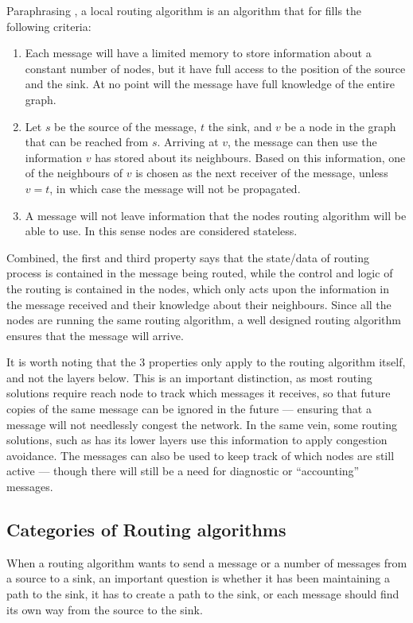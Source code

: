 Paraphrasing \cite{compass}, a local routing algorithm is an algorithm that for fills the following criteria:
\begin{enumerate}
\item Each message will have a limited memory to store information about a constant number of nodes, but it have full access to the position of the source and the sink. At no point will the message have full knowledge of the entire graph. 
\item Let $s$ be the source of the message, $t$ the sink, and $v$ be a node in the graph that can be reached from $s$. Arriving at $v$, the message can then use the information $v$ has stored about its neighbours. Based on this information, one of the neighbours of $v$ is chosen as the next receiver of the message, unless $v = t$, in which case the message will not be propagated.
\item A message will not leave information that the nodes routing algorithm will be able to use. In this sense nodes are considered stateless.
\end{enumerate}

Combined, the first and third property says that the state/data of routing process is contained in the message being routed, while the control and logic of the routing is contained in the nodes, which only acts upon the information in the message received and their knowledge about their neighbours. Since all the nodes are running the same routing algorithm, a well designed routing algorithm ensures that the message will arrive.

\label{record-recived}
It is worth noting that the 3 properties only apply to the routing algorithm itself, and not the layers below. This is an important distinction, as most routing solutions require reach node to track which messages it receives, so that future copies of the same message can be ignored in the future --- ensuring that a message will not needlessly congest the network. In the same vein, some routing solutions, such as \cite{speed} has its lower layers use this information to apply congestion avoidance. The messages can also be used to keep track of which nodes are still active --- though there will still be a need for diagnostic or ``accounting'' messages. 

\subsection{Categories of Routing algorithms}
\label{section:cat_routing}
When a routing algorithm wants to send a message or a number of messages from a source to a sink, an important question is whether it has been maintaining a path to the sink, it has to create a path to the sink, or each message should find its own way from the source to the sink.

